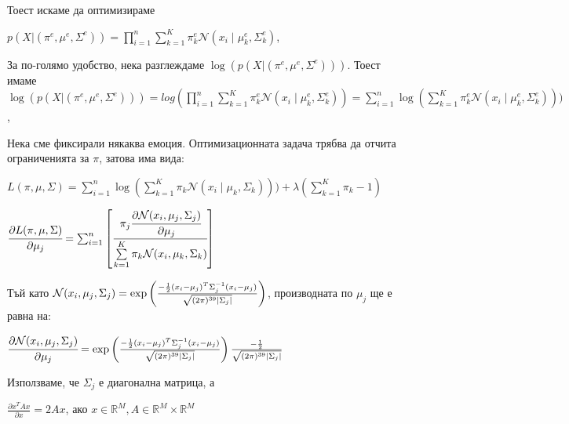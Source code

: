 \documentclass[main.tex]{subfiles}
\begin{document}
Тоест искаме да оптимизираме

$p(X|(\pi^e, \mu^e, \Sigma^e)) = \prod\limits_{i=1}^{n} \sum\limits_{k=1}^{K} \pi_k^e \mathcal{N}(x_i\mid \mu_k^e, \Sigma_k^e)$,

За по-голямо удобство, нека разглеждаме $\log(p(X|(\pi^e, \mu^e, \Sigma^e)))$. Тоест имаме
$\log(p(X|(\pi^e, \mu^e, \Sigma^e))) = log(\prod\limits_{i=1}^{n} \sum\limits_{k=1}^{K} \pi_k^e \mathcal{N}(x_i\mid \mu_k^e, \Sigma_k^e)) = \sum\limits_{i=1}^{n} \log(\sum\limits_{k=1}^{K} \pi_k^e \mathcal{N}(x_i\mid \mu_k^e, \Sigma_k^e)))$,

Нека сме фиксирали някаква емоция. Оптимизационната задача трябва да отчита ограниченията за $\pi$, затова има вида:

$L(\pi, \mu, \Sigma) = \sum\limits_{i=1}^{n} \log(\sum\limits_{k=1}^{K} \pi_k \mathcal{N}(x_i\mid \mu_k, \Sigma_k))) + \lambda(\sum\limits_{k=1}^K \pi_k - 1)$

$\cfrac{\partial L(\pi, \mu, \Sigma)}{\partial \mu_j} = \sum_{i=1}^{n} \left[ \cfrac{\pi_j \cfrac{\partial \mathcal{N}(x_i, \mu_j, \Sigma_j)}{\partial \mu_j} }{\sum\limits_{k=1}^K \pi_k \mathcal{N}(x_i, \mu_k, \Sigma_k)}\right]$ 

Тъй като $\mathcal{N}(x_i, \mu_j, \Sigma_j) = \exp\left(\frac{-\frac{1}{2}(x_i - \mu_j)^{T}\Sigma^{-1}_j(x_i - \mu_j)}{\sqrt{(2\pi)^{39}|\Sigma_j|}}\right)$, производната по $\mu_j$ ще е равна на:

$\cfrac{\partial \mathcal{N}(x_i, \mu_j, \Sigma_j)}{\partial \mu_j}= \exp\left(\frac{-\frac{1}{2}(x_i - \mu_j)^{T}\Sigma^{-1}_j(x_i - \mu_j)}{\sqrt{(2\pi)^{39}|\Sigma_j|}}\right) \frac{-\frac{1}{2}}{\sqrt{(2\pi)^{39}|\Sigma_j|}}$

Използваме, че $\Sigma_j$ е диагонална матрица, а

$\frac{\partial x^T A x}{\partial x} = 2Ax$, ако $x \in \mathbb{R}^M, A\in \mathbb{R}^M\times\mathbb{R}^M$
\end{document}
